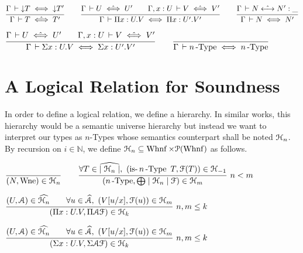 \documentclass[a4paper,english]{lipics-utf8x}
\begin{document}

  \begin{center}
  \(
    \ru{\Gamma \der \red T \iff \red T'
      }{\Gamma \der T \hiff T'}
    \qquad
    \ru{\Gamma \der U \hiff U' \qquad
        \Gamma, x:U \der V \hiff V'
      }{\Gamma \der \Pi x:U.V \iff \Pi x:U'.V'}
    \qquad
    \ru{\Gamma \der N \hsteq N' : \_
      }{\Gamma \der N \iff N'}
  \)
  \end{center}

  \begin{center}
  \(
    \ru{\Gamma \der U \hiff U' \qquad
        \Gamma, x:U \der V \hiff V'
      }{\Gamma \der \Sigma x:U.V \iff \Sigma x:U'.V'}
    \qquad
    \ru{}{\Gamma \der \nType{n} \iff \nType{n}}
  \)
  \end{center}

  \section{A Logical Relation for Soundness}


  In order to define a logical relation, we define a hierarchy.
  In similar works, this hierarchy would be a semantic universe hierarchy but
  instead we want to interpret our types as $n$-Types whose semantics
  counterpart shall be noted $\mathcal{H}_n$.
  By recursion on $i \in \mathbb{N}$, we define
  $\mathcal{H}_n \subseteq \operatorname{Whnf} \times \mathcal{P}(\operatorname{Whnf})$ as follows.

  \begin{center}
  \(
    \ru{}{(N, \Wne) \in \Hu_n}
    \qquad
    \rux{\forall T \in \widehat{\mid \Hu_n \mid},\ %
         (\isnType{n}{T}, \mathcal{F}(T)) \in \Hu_{-1}
       }{(\nType{n}, \bigoplus \mid \Hu_n \mid \mathcal{F}) \in \Hu_m
       }{n < m}
  \)
  \end{center}

  \begin{center}
  \(
    \rux{(U, \mathcal{A}) \in \widehat{\Hu_n} \qquad
        \forall u \in \widehat{\mathcal{A}},\ (V[u/x], \mathcal{F}(u)) \in \Hu_m
       }{(\Pi x:U.V, \Pi \mathcal{A} \mathcal{F}) \in \Hu_k
       }{n,m \le k}
  \)
  \end{center}

  \begin{center}
  \(
    \rux{(U, \mathcal{A}) \in \widehat{\Hu_n} \qquad
        \forall u \in \widehat{\mathcal{A}},\ (V[u/x], \mathcal{F}(u)) \in \Hu_m
       }{(\Sigma x:U.V, \Sigma \mathcal{A} \mathcal{F}) \in \Hu_k
       }{n,m \le k}
  \)
  \end{center}
\end{document}
